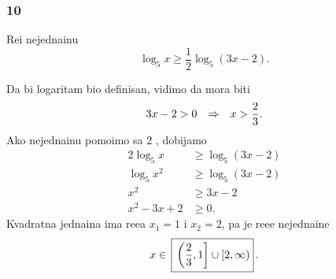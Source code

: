 \subsubsection{10}

\zadatak
Re{\sv}i nejedna{\cv}inu
$$
\log_5 x \ge \frac12 \log_5(3x-2).
$$

\resenje
Da bi logaritam bio definisan, vidimo da mora biti
$$
3x-2>0{\quad\Rightarrow\quad} x>\frac23.
$$
Ako nejedna{\cv}inu pomo{\zv}imo sa 2 , dobijamo
\begin{align*}
    2\log_5 x   &\ge \log_5(3x-2)\\
    \log_5 x^2  &\ge \log_5(3x-2)\\
    x^2 &\ge 3x-2\\
    x^2 -3x + 2 &\ge 0.
\end{align*}
Kvadratna jedna{\cv}ina ima re{\sv}e{\nj}a $x_1=1$ i $x_2=2$,
pa je re{\sv}e{\nj}e nejedna{\cv}ine
$$
x\in\ram{\left( \frac23, 1 \right] \cup  [2, \infty )}.
$$

